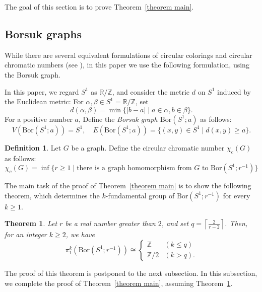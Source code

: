 \documentclass[11pt, amsfonts]{amsart}
\numberwithin{equation}{section}
\newtheorem{theorem}[thm]{Theorem}
\theoremstyle{definition}
\newtheorem{definition}[thm]{Definition}
\theoremstyle{remark}
\newcommand{\ZZ}{\mathbb{Z}}
\newcommand{\RR}{\mathbb{R}}
\newcommand{\Bor}{\mathrm{Bor}}
\begin{document}
The goal of this section is to prove Theorem~\ref{theorem main}.

\subsection{Borsuk graphs} \label{subsection Borsuk graph}

While there are several equivalent formulations of circular colorings and circular chromatic numbers (see \cite{Zhu}), in this paper we use the following formulation, using the Borsuk graph.

In this paper, we regard $S^1$ as $\RR / \ZZ$, and consider the metric $d$ on $S^1$ induced by the Euclidean metric: For $\alpha, \beta \in S^1 = \RR / \ZZ$, set
\[ d(\alpha, \beta) = \min \{ |b-a| \mid a \in \alpha, b \in \beta \}.\]
For a positive number $a$, Define the \emph{Borsuk graph $\Bor(S^1; a)$} as follows:
\[ V(\Bor(S^1 ; a)) = S^1,\quad E(\Bor(S^1 ; a)) = \{ (x,y) \in S^1 \mid d(x,y) \ge a \}.\]

\begin{definition} \label{definition circular chromatic number}
Let $G$ be a graph. Define the circular chromatic number $\chi_c(G)$ as follows:
\[ \chi_c(G) = \inf \{ r \ge 1 \mid \textrm{there is a graph homomorphism from $G$ to $\Bor(S^1 ; r^{-1})$}\}\]
\end{definition}

The main task of the proof of Theorem~\ref{theorem main} is to show the following theorem, which determines the $k$-fundamental group of $\Bor(S^1; r^{-1})$ for every $k \ge 1$.

\begin{theorem} \label{theorem pi_1}
Let $r$ be a real number greater than $2$, and set $q = \left\lceil \frac{2}{r - 2} \right\rceil $. Then, for an integer $k \ge 2$, we have
\[ \pi_1^k (\Bor(S^1 ; r^{-1})) \cong \begin{cases}
\ZZ & (k \le q) \\
\ZZ / 2 & (k > q).
\end{cases}\]
\end{theorem}

The proof of this theorem is postponed to the next subsection. In this subsection, we complete the proof of Theorem~\ref{theorem main}, assuming Theorem~\ref{theorem pi_1}.
\end{document}
